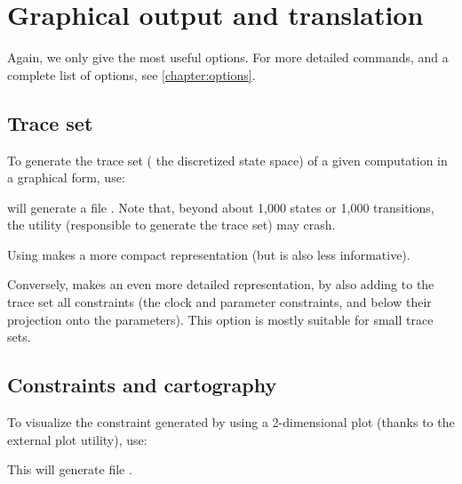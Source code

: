 \chapter{Graphical output and translation}


Again, we only give the most useful options.
For more detailed commands, and a complete list of options, see \cref{chapter:options}.

\section{Trace set}

To generate the trace set (\ie{} the discretized state space) of a given computation in a graphical form, use:


\imitator{} will generate a file .
Note that, beyond about 1,000 states or 1,000 transitions, the \gdot{} utility (responsible to generate the trace set) may crash.

Using  makes a more compact representation (but is also less informative).

Conversely,  makes an even more detailed representation, by also adding to the trace set all constraints (the clock and parameter constraints, and below their projection onto the parameters).
This option is mostly suitable for small trace sets.



\section{Constraints and cartography}

To visualize the constraint generated by \imitator{} using a 2-dimensional plot (thanks to the external plot utility), use:


This will generate file .

